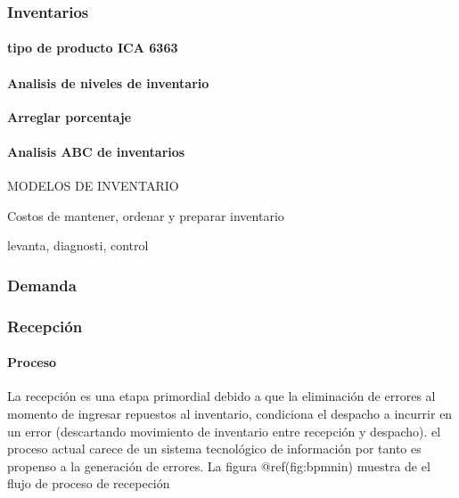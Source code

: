 \documentclass[
]{article}
\begin{document}
\hypertarget{inventarios}{%
\subsubsection{Inventarios}\label{inventarios}}

\hypertarget{tipo-de-producto-ica-6363}{%
\paragraph{tipo de producto ICA 6363}\label{tipo-de-producto-ica-6363}}

\hypertarget{analisis-de-niveles-de-inventario}{%
\paragraph{Analisis de niveles de
inventario}\label{analisis-de-niveles-de-inventario}}

\textbf{Arreglar porcentaje}

\hypertarget{analisis-abc-de-inventarios}{%
\paragraph{Analisis ABC de
inventarios}\label{analisis-abc-de-inventarios}}

MODELOS DE INVENTARIO

Costos de mantener, ordenar y preparar inventario

levanta, diagnosti, control

\hypertarget{demanda}{%
\subsubsection{Demanda}\label{demanda}}

\hypertarget{recepciuxf3n}{%
\subsubsection{Recepción}\label{recepciuxf3n}}

\hypertarget{proceso}{%
\paragraph{Proceso}\label{proceso}}

La recepción es una etapa primordial debido a que la eliminación de
errores al momento de ingresar repuestos al inventario, condiciona el
despacho a incurrir en un error (descartando movimiento de inventario
entre recepción y despacho). el proceso actual carece de un sistema
tecnológico de información por tanto es propenso a la generación de
errores. La figura @ref(fig:bpmnin) muestra de el flujo de proceso de
recepeción
\end{document}

